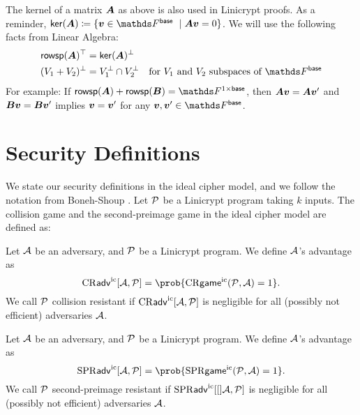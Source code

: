 The kernel of a matrix $\v A$ as above is also used in Linicrypt proofs.
As a reminder, $\ker(\v A) \coloneqq \{ \vv \in \Fsp\ \mid \v A \vv = 0\}$.
We will use the following facts from Linear Algebra:
\begin{align*}
  \rowsp(\v A)^\top &= \ker(\v A)^\perp \\
  (V_1 + V_2)^\perp &= V_1^\perp \cap V_2^\perp \quad \textrm{for $V_1$ and $V_2$ subspaces of $\Fsp$}
\end{align*}
For example:
If $\rowsp(\v A) + \rowsp(\v B) = \Frowsp$,
then $\v A \vv = \v A \vv'$ and $\v B \vv = \v B \vv'$ implies $\vv = \vv'$ for any $\vv, \vv' \in \Fsp$.

\section{Security Definitions}
We state our security definitions in the ideal cipher model, and we
follow the notation from Boneh-Shoup \cite{Boneh2015CourseIA}.
Let $\P$ be a Linicrypt program taking $k$ inputs.
The collision game and the second-preimage game in the ideal cipher model are defined as:
\begin{pchstack}[center, space=0.4cm]
\end{pchstack}

\begin{defn}
\label{defn:collision_resistance_ic}
  Let $\A$ be an adversary, and $\P$ be a Linicrypt program.
  We define $\A$'s advantage as 
  \[
    \cradv{\A, \P} = \prob{\crgame(\P, \A) = 1}.
  \]
  We call $\P$ collision resistant if
  $\cradv{\A, \P}$ is negligible for all (possibly not efficient) adversaries $\A$.
\end{defn}

\begin{defn}
\label{defn:second_preimage_resistance_ic}
  Let $\A$ be an adversary, and $\P$ be a Linicrypt program.
  We define $\A$'s advantage as 
  \[
    \spradv{\A, \P} = \prob{\sprgame(\P, \A) = 1}.
  \]
  We call $\P$ second-preimage resistant
  if $\spradv[\A, \P]$ is negligible for all (possibly not efficient) adversaries $\A$.
\end{defn}

